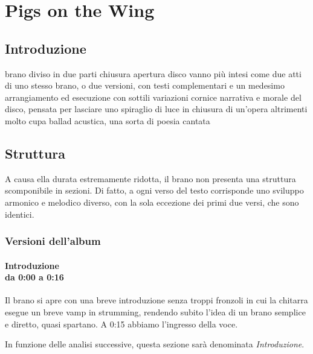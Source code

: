 \documentclass[class=book, crop=false, oneside, 12pt]{standalone}
\begin{document}
    \chapter{Pigs on the Wing}
    


    \section{Introduzione}
    \label{sec:03-intro}
    brano diviso in due parti chiusura apertura disco
    vanno più intesi come due atti di uno stesso brano, o due versioni, con testi complementari e un medesimo arrangiamento ed esecuzione con sottili variazioni
    cornice narrativa e morale del disco, pensata per lasciare uno spiraglio di luce in chiusura di un'opera altrimenti molto cupa
    ballad acustica, una sorta di poesia cantata
    
    \section{Struttura}
    \label{sec:03-structure}
    A causa ella durata estremamente ridotta, il brano non presenta una struttura scomponibile in sezioni. Di fatto, a ogni verso del testo corrisponde uno sviluppo armonico e melodico diverso, con la sola eccezione dei primi due versi, che sono identici. 
    
    \subsection{Versioni dell'album}
    
    \subsubsection*{Introduzione\\ \small{da 0:00 a 0:16}}
    Il brano si apre con una breve introduzione senza troppi fronzoli in cui la chitarra esegue un breve vamp in strumming, rendendo subito l'idea di un brano semplice e diretto, quasi spartano. A 0:15 abbiamo l'ingresso della voce.
    
    In funzione delle analisi successive, questa sezione sarà denominata \emph{Introduzione}.
\end{document}
